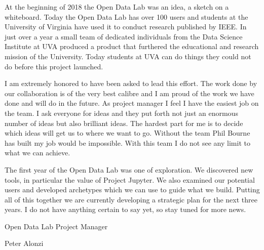 At the beginning of 2018 the Open Data Lab was an idea, a sketch on a whiteboard. Today the Open Data Lab has over 100 users and students at the University of Virginia have used it to conduct research published by IEEE. In just over a year a small team of dedicated individuals from the Data Science Institute at UVA produced a product that furthered the educational and research mission of the University. Today students at UVA can do things they could not do before this project launched.

I am extremely honored to have been asked to lead this effort. The work done by our collaboration is of the very best calibre and I am proud of the work we have done and will do in the future. As project manager I feel I have the easiest job on the team. I ask everyone for ideas and they put forth not just an enormous number of ideas but also brilliant ideas. The hardest part for me is to decide which ideas will get us to where we want to go. Without the team Phil Bourne has built my job would be impossible. With this team I do not see any limit to what we can achieve.

The first year of the Open Data Lab was one of exploration. We discovered new tools, in particular the value of Project Jupyter. We also examined our potential users and developed archetypes which we can use to guide what we build. Putting all of this together we are currently developing a strategic plan for the next three years. I do not have anything certain to say yet, so stay tuned for more news.

\begin{flushright}

\bigskip

Open Data Lab Project Manager

\bigskip

Peter Alonzi

\end{flushright}
